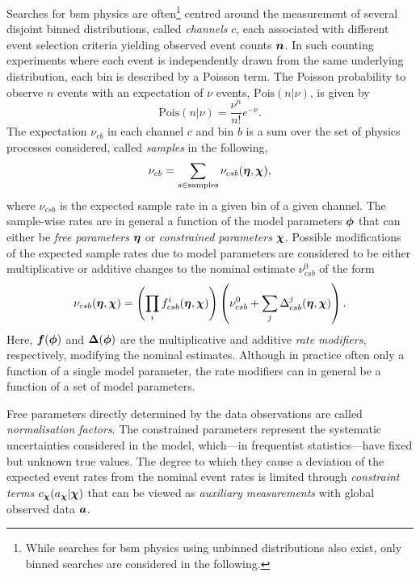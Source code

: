 Searches for \gls{bsm} physics are often\footnote{While searches for \gls{bsm} physics using unbinned distributions also exist, only binned searches are considered in the following.} centred around the measurement of several disjoint binned distributions, called \textit{channels} $c$, each associated with different event selection criteria yielding observed event counts $\makemebold{n}$.
In such counting experiments where each event is independently drawn from the same underlying distribution, each bin is described by a Poisson term.
The Poisson probability to observe $n$ events with an expectation of $\nu$ events, $\mathrm{Pois}(n\vert\nu)$, is given by
\begin{equation}
	\mathrm{Pois}(n\vert\nu) = \frac{\nu^n}{n!}e^{-\nu}.
\end{equation}
The expectation $\nu_{cb}$ in each channel $c$ and bin $b$ is a sum over the set of physics processes considered, called \textit{samples} in the following, 
\begin{equation}
	\nu_{cb} = \sum_{s\in\mathrm{samples}}\nu_{csb}(\makemebold{\eta},\makemebold{\chi}),
\end{equation}
where $\nu_{csb}$ is the expected sample rate in a given bin of a given channel. The sample-wise rates are in general a function of the model parameters $\makemebold{\phi}$ that can either be \textit{free parameters} $\makemebold{\eta}$ or \textit{constrained parameters} $\makemebold{\chi}$. Possible modifications of the expected sample rates due to model parameters are considered to be either multiplicative or additive changes to the nominal estimate $\nu_{csb}^0$ of the form
\begin{equation}
	\nu_{csb}(\makemebold{\eta},\makemebold{\chi}) = \left(\prod_i f^i_{csb}(\makemebold{\eta},\makemebold{\chi}) \right)\left(\nu^0_{csb} + \sum_j {\Delta^j_{csb}(\makemebold{\eta},\makemebold{\chi})} \right).
\end{equation}
Here, $\makemebold{f}(\makemebold{\phi})$ and $\makemebold{\Delta}(\makemebold{\phi})$ are the multiplicative and additive \textit{rate modifiers}, respectively, modifying the nominal estimates. Although in practice often only a function of a single model parameter, the rate modifiers can in general be a function of a set of model parameters.

Free parameters directly determined by the data observations are called \textit{normalisation factors}.
The constrained parameters represent the systematic uncertainties considered in the model, which---in frequentist statistics---have fixed but unknown true values.
The degree to which they cause a deviation of the expected event rates from the nominal event rates is limited through \textit{constraint terms} $c_{\makemebold{\chi}}(a_{\makemebold{\chi}}\vert\makemebold{\chi})$ that can be viewed as \textit{auxiliary measurements} with global observed data $\makemebold{a}$. 

